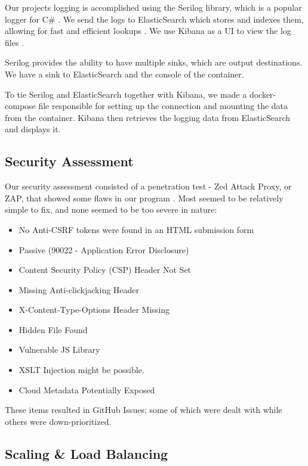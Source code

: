Our projects logging is accomplished using the Serilog library, which is a popular logger for C\# \autocite{serilog}. We send the logs to ElasticSearch which stores and indexes them, allowing for fast and efficient lookups \autocite{elasticsearch}. We use Kibana as a UI to view the log files \autocite{kibana}.

Serilog provides the ability to have multiple sinks, which are output destinations. We have a sink to ElasticSearch and the console of the container. 

To tie Serilog and ElasticSearch together with Kibana, we made a docker-compose file responsible for setting up the connection and mounting the data from the container. Kibana then retrieves the logging data from ElasticSearch and displays it.
\subsection{Security Assessment}

Our security assessment consisted of a penetration test - Zed Attack Proxy, or ZAP, that showed some flaws in our program \autocite{zap}. Most seemed to be relatively simple to fix, and none seemed to be too severe in nature:
\begin{itemize}
    \item No Anti-CSRF tokens were found in an HTML submission form
    \item Passive (90022 - Application Error Disclosure)
    \item Content Security Policy (CSP) Header Not Set
    \item Missing Anti-clickjacking Header
    \item X-Content-Type-Options Header Missing
    \item Hidden File Found
    \item Vulnerable JS Library
    \item XSLT Injection might be possible.
    \item Cloud Metadata Potentially Exposed
\end{itemize}

\noindent These items resulted in GitHub Issues; some of which were dealt with while others were down-prioritized.

\subsection{Scaling \& Load Balancing}

